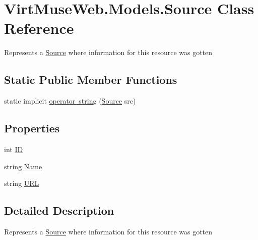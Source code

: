 \hypertarget{class_virt_muse_web_1_1_models_1_1_source}{}\section{Virt\+Muse\+Web.\+Models.\+Source Class Reference}
\label{class_virt_muse_web_1_1_models_1_1_source}


Represents a \mbox{\hyperlink{class_virt_muse_web_1_1_models_1_1_source}{Source}} where information for this resource was gotten  


\subsection*{Static Public Member Functions}
\begin{DoxyCompactItemize}
\item 
static implicit \mbox{\hyperlink{class_virt_muse_web_1_1_models_1_1_source_acd933e8a81cff0d4a66f271da6a7995d}{operator string}} (\mbox{\hyperlink{class_virt_muse_web_1_1_models_1_1_source}{Source}} src)
\end{DoxyCompactItemize}
\subsection*{Properties}
\begin{DoxyCompactItemize}
\item 
int \mbox{\hyperlink{class_virt_muse_web_1_1_models_1_1_source_a10ca9b78cbda18e52858594f92919d19}{ID}}
\item 
string \mbox{\hyperlink{class_virt_muse_web_1_1_models_1_1_source_a7e1487db24858ab8e3b7bd65e296bfb2}{Name}}
\item 
string \mbox{\hyperlink{class_virt_muse_web_1_1_models_1_1_source_a93f4b8e4e4c0997a2bcecb7e40b40f82}{U\+RL}}
\end{DoxyCompactItemize}


\subsection{Detailed Description}
Represents a \mbox{\hyperlink{class_virt_muse_web_1_1_models_1_1_source}{Source}} where information for this resource was gotten 




